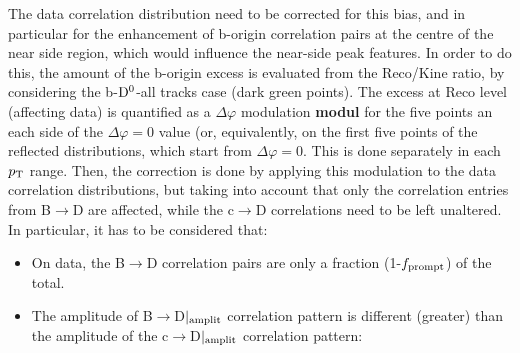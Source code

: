 The data correlation distribution need to be corrected for this bias, and in particular for the enhancement of b-origin correlation pairs at the centre of the near side region, which would influence the near-side peak features.
In order to do this, the amount of the b-origin excess is evaluated from the Reco/Kine ratio, by considering the b-${\rm D^0}$-all tracks case (dark green points). The excess at Reco level (affecting data) is quantified as a $\Delta\varphi$ modulation {\bf modul} for the five points an each side of the $\Delta\varphi = 0$ value (or, equivalently, on the first five points of the reflected distributions, which start from $\Delta\varphi=0$. This is done separately in each $p_{\rm T}$ range.
Then, the correction is done by applying this modulation to the data correlation distributions, but taking into account that only the correlation entries from B$\rightarrow$D are affected, while the c$\rightarrow$D correlations need to be left unaltered.
In particular, it has to be considered that:
\begin{itemize}
\item On data, the B$\rightarrow$D correlation pairs are only a fraction (1-$f_{\rm prompt}$) of the total.
\item The amplitude of B$\rightarrow$D$|_{\rm amplit}$ correlation pattern is different (greater) than the amplitude of the c$\rightarrow$D$|_{\rm amplit}$ correlation pattern:
\end{itemize}

